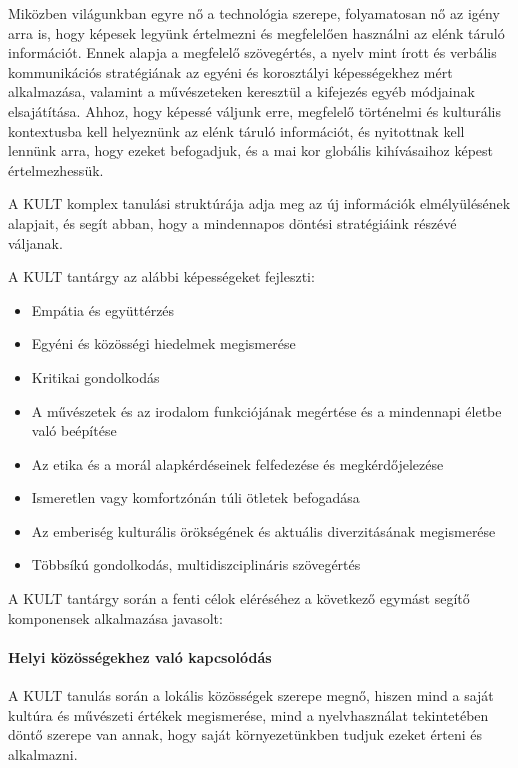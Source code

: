 Miközben világunkban egyre nő a technológia szerepe, folyamatosan nő az igény arra is, hogy képesek legyünk értelmezni és megfelelően használni az elénk táruló információt. Ennek alapja a megfelelő szövegértés, a nyelv mint írott és verbális kommunikációs stratégiának az egyéni és korosztályi képességekhez mért alkalmazása, valamint a művészeteken keresztül a kifejezés egyéb módjainak elsajátítása. Ahhoz, hogy képessé váljunk erre, megfelelő történelmi és kulturális kontextusba kell helyeznünk az elénk táruló információt, és nyitottnak kell lennünk arra, hogy ezeket befogadjuk, és a mai kor globális kihívásaihoz képest értelmezhessük.

A KULT komplex tanulási struktúrája adja meg az új információk elmélyülésének alapjait, és segít abban, hogy a mindennapos döntési stratégiáink részévé váljanak.

A KULT tantárgy az alábbi képességeket fejleszti:
\begin{itemize}
\item Empátia és együttérzés

\item Egyéni és közösségi hiedelmek megismerése

\item Kritikai gondolkodás

\item A művészetek és az irodalom funkciójának megértése és a mindennapi életbe való beépítése

\item Az etika és a morál alapkérdéseinek felfedezése és megkérdőjelezése

\item Ismeretlen vagy komfortzónán túli ötletek befogadása

\item Az emberiség kulturális örökségének és aktuális diverzitásának megismerése

\item Többsíkú gondolkodás, multidiszciplináris szövegértés
\end{itemize}

A KULT tantárgy során a fenti célok eléréséhez a következő egymást segítő komponensek alkalmazása javasolt:

\paragraph{Helyi közösségekhez való kapcsolódás}

A KULT tanulás során a lokális közösségek szerepe megnő, hiszen mind a saját kultúra és művészeti értékek megismerése, mind a nyelvhasználat tekintetében döntő szerepe van annak, hogy saját környezetünkben  tudjuk ezeket érteni és alkalmazni.


